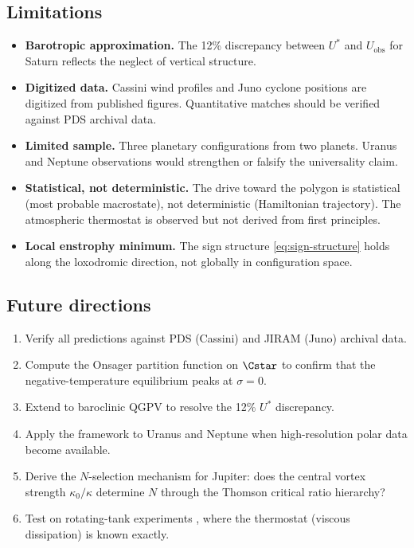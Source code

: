\subsection{Limitations}

\begin{itemize}
  \item \textbf{Barotropic approximation.}  The 12\% discrepancy between
    $U^*$ and $U_{\mathrm{obs}}$ for Saturn reflects the neglect of
    vertical structure.

  \item \textbf{Digitized data.}  Cassini wind profiles and Juno cyclone
    positions are digitized from published figures.  Quantitative matches
    should be verified against PDS archival data.

  \item \textbf{Limited sample.}  Three planetary configurations from two
    planets.  Uranus and Neptune observations would strengthen or falsify
    the universality claim.

  \item \textbf{Statistical, not deterministic.}  The drive toward the
    polygon is statistical (most probable macrostate), not deterministic
    (Hamiltonian trajectory).  The atmospheric thermostat is observed but
    not derived from first principles.

  \item \textbf{Local enstrophy minimum.}  The sign structure
    \eqref{eq:sign-structure} holds along the loxodromic direction, not
    globally in configuration space.
\end{itemize}

\subsection{Future directions}

\begin{enumerate}
  \item Verify all predictions against PDS (Cassini) and JIRAM (Juno)
    archival data.
  \item Compute the Onsager partition function on $\Cstar$ to confirm
    that the negative-temperature equilibrium peaks at $\sigma = 0$.
  \item Extend to baroclinic QGPV to resolve the 12\% $U^*$ discrepancy.
  \item Apply the framework to Uranus and Neptune when high-resolution
    polar data become available.
  \item Derive the $N$-selection mechanism for Jupiter: does the central
    vortex strength $\kappa_0/\kappa$ determine $N$ through the Thomson
    critical ratio hierarchy?
  \item Test on rotating-tank experiments \citep{BarbosaAguiar2010}, where
    the thermostat (viscous dissipation) is known exactly.
\end{enumerate}
